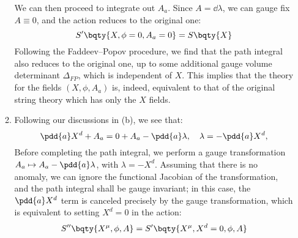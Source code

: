 \documentclass[a4paper,10pt]{article}
\begin{document}
\begin{enumerate}
\begin{enumerate}
	
	We can then proceed to integrate out $A_a$. Since $A = \dd{\lambda}$, we can gauge fix $A \equiv 0$, and the action reduces to the original one:
	\begin{equation}
		S'\bqty{X,\phi=0,A_a=0}
		= S\bqty{X}
	\end{equation}
	Following the Faddeev--Popov procedure, we find that the path integral also reduces to the original one, up to some additional gauge volume determinant $\Delta_{FP}$, which is independent of $X$. This implies that the theory for the fields $(X,\phi,A_a)$ is, indeed, equivalent to that of the original string theory which has only the $X$ fields.
	
	\item Following our discussions in (b), we see that:
	\begin{equation}
		\pdd{a} X^d + A_a
		= 0 + A_a - \pdd{a} \lambda,\quad
		\lambda = -\pdd{a} X^d,
	\end{equation}
	Before completing the path integral, we perform a gauge transformation $
		A_a \mapsto A_a - \pdd{a} \lambda
	$, with $\lambda =  -X^d$. Assuming that there is no anomaly, we can ignore the functional Jacobian of the transformation, and the path integral shall be gauge invariant; in this case, the $\pdd{a} X^d$ term is canceled precisely by the gauge transformation, which is equivalent to setting $X^d = 0$ in the action:
	\begin{equation}
		S''\bqty{
				X^\mu,\phi,A
			}
		= S'\bqty{
				X^\mu,X^d = 0,\phi,A
			}
	\end{equation}
	
	
	
	\end{enumerate}
	
	
	
	
	
	
	
	\legacyReference
	

\end{enumerate}
\end{document}
